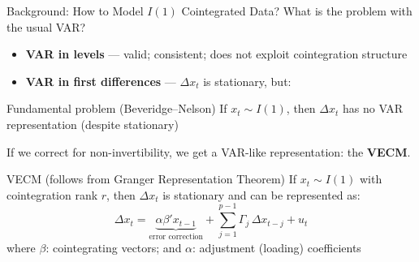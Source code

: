 \documentclass[aspectratio=169,11pt]{beamer}
\begin{document}
\begin{frame}{Background: How to Model $I(1)$ Cointegrated Data?}
    \vspace{-1em}
    What is the problem with the usual VAR?
    \pause 
    \begin{itemize}
        \item \textbf{VAR in levels} --- valid; consistent; does not exploit cointegration structure
        \item \textbf{VAR in first differences} --- $\Delta x_t$ is stationary, but:
    \end{itemize}
    \pause
    \begin{alertblock}{Fundamental problem (Beveridge--Nelson)}
       If $x_t\sim I(1)$, then $\Delta x_t$ has no VAR representation (despite stationary)
    \end{alertblock}
    \pause
    If we correct for non-invertibility, we get a VAR-like representation: the \textbf{VECM}.
    \vspace{0.3em}
    \begin{block}{VECM (follows from Granger Representation Theorem)}
    If $x_t\sim I(1)$ with cointegration rank $r$, then $\Delta x_t$ is stationary and can be represented as:
        \begin{equation*}
        \Delta x_t = \underbrace{\alpha\beta' x_{t-1}}_{\text{error correction}} + \sum_{j=1}^{p-1}\Gamma_j\,\Delta x_{t-j} + u_t
        \end{equation*}
        where $\beta$: cointegrating vectors; and $\alpha$: adjustment (loading) coefficients
    \end{block}
\end{frame}
\end{document}
